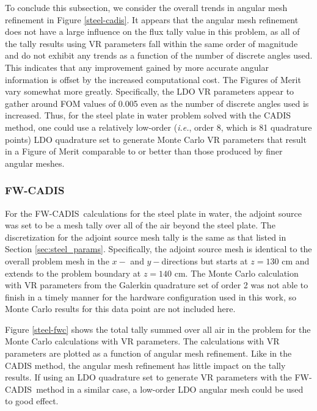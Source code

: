 \documentclass{article} %
\newcommand{\fwc}{\mbox{FW-CADIS}}
\begin{document}
To conclude this subsection, we consider the overall trends in angular mesh
refinement in Figure \ref{steel-cadis}. It appears that the angular mesh
refinement does not have a large influence on the flux tally value in this
problem, as all of the tally results using VR parameters fall within the same
order of magnitude and do not exhibit any trends as a function of the number
of discrete angles used. This indicates that any improvement gained by more
accurate angular information is offset by the increased computational cost.
The Figures of Merit vary somewhat more greatly. Specifically, the LDO VR
parameters appear to gather around FOM values of 0.005 even as the number of
discrete angles used is increased. Thus, for the steel plate in water problem
solved with the CADIS method, one could use a relatively low-order
(\textit{i.e.}, order 8, which is 81 quadrature points) LDO quadrature set to
generate Monte Carlo VR parameters that result in a Figure of Merit comparable
to or better than those produced by finer angular meshes.

\FloatBarrier
\subsubsection{\fwc}

For the \fwc\ calculations for the steel plate in water, the adjoint source
was set to be a mesh tally over all of the air beyond the steel plate. The
discretization for the adjoint source mesh tally is the same as that listed in
Section \ref{sec:steel_params}. Specifically, the adjoint source mesh is
identical to the overall problem mesh in the $x-$ and $y-$directions but
starts at $z = 130$ cm and extends to the problem boundary at $z = 140$ cm.
The Monte Carlo calculation with VR parameters from the Galerkin
quadrature set of order 2 was not able to finish in a timely manner for the
hardware configuration used in this work, so Monte Carlo results for this data
point are not included here.

Figure \ref{steel-fwc} shows the total tally summed over all air in the
problem for the Monte Carlo calculations with VR parameters. The calculations
with VR parameters are plotted as a function of angular mesh refinement. Like
in the CADIS method, the angular mesh refinement has little impact on the
tally results. If using an LDO quadrature set to generate VR parameters with
the \fwc\ method in a similar case, a low-order LDO angular mesh could be
used to good effect.
\end{document}
